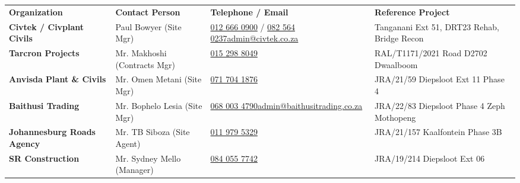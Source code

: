 \documentclass[a4paper,11pt]{article}
\begin{document}
\renewcommand{\arraystretch}{1.28}
\begin{tabularx}{\textwidth}{@{}
    >{\raggedright\arraybackslash}p{3.5cm} 
    >{\raggedright\arraybackslash}p{3.1cm} 
    >{\raggedright\arraybackslash}p{4.2cm} 
    >{\raggedright\arraybackslash}X
@{}}
\rowcolor{mhnavy}
{\color{white}\bfseries\fontsize{8pt}{9.8pt}\selectfont Organization} &
{\color{white}\bfseries\fontsize{8pt}{9.8pt}\selectfont Contact Person} &
{\color{white}\bfseries\fontsize{8pt}{9.8pt}\selectfont Telephone / Email} &
{\color{white}\bfseries\fontsize{8pt}{9.8pt}\selectfont Reference Project} \\
\rowcolor{mhbluelight}
\fontsize{7.6pt}{9.4pt}\selectfont\bfseries Civtek / Civplant Civils & \fontsize{7.6pt}{9.4pt}\selectfont Paul Bowyer (Site Mgr) & \fontsize{7.6pt}{9.4pt}\selectfont \href{tel:0126660900}{012 666 0900} / \href{tel:0825640237}{082 564 0237}\newline\href{mailto:admin@civtek.co.za}{admin@civtek.co.za} & \fontsize{7.6pt}{9.4pt}\selectfont Tanganani Ext 51, DRT23 Rehab, Bridge Recon \\
\fontsize{7.6pt}{9.4pt}\selectfont\bfseries Tarcron Projects & \fontsize{7.6pt}{9.4pt}\selectfont Mr. Makhoshi (Contracts Mgr) & \fontsize{7.6pt}{9.4pt}\selectfont \href{tel:0152988049}{015 298 8049} & \fontsize{7.6pt}{9.4pt}\selectfont RAL/T1171/2021 Road D2702 Dwaalboom \\
\rowcolor{mhbluelight}
\fontsize{7.6pt}{9.4pt}\selectfont\bfseries Anvisda Plant \& Civils & \fontsize{7.6pt}{9.4pt}\selectfont Mr. Omen Metani (Site Mgr) & \fontsize{7.6pt}{9.4pt}\selectfont \href{tel:0717041876}{071 704 1876} & \fontsize{7.6pt}{9.4pt}\selectfont JRA/21/59 Diepsloot Ext 11 Phase 4 \\
\fontsize{7.6pt}{9.4pt}\selectfont\bfseries Baithusi Trading & \fontsize{7.6pt}{9.4pt}\selectfont Mr. Bophelo Lesia (Site Mgr) & \fontsize{7.6pt}{9.4pt}\selectfont \href{tel:0680034790}{068 003 4790}\newline\href{mailto:admin@baithusitrading.co.za}{admin@baithusitrading.co.za} & \fontsize{7.6pt}{9.4pt}\selectfont JRA/22/83 Diepsloot Phase 4 Zeph Mothopeng \\
\rowcolor{mhbluelight}
\fontsize{7.6pt}{9.4pt}\selectfont\bfseries Johannesburg Roads Agency & \fontsize{7.6pt}{9.4pt}\selectfont Mr. TB Siboza (Site Agent) & \fontsize{7.6pt}{9.4pt}\selectfont \href{tel:0119795329}{011 979 5329} & \fontsize{7.6pt}{9.4pt}\selectfont JRA/21/157 Kaalfontein Phase 3B \\
\fontsize{7.6pt}{9.4pt}\selectfont\bfseries SR Construction & \fontsize{7.6pt}{9.4pt}\selectfont Mr. Sydney Mello (Manager) & \fontsize{7.6pt}{9.4pt}\selectfont \href{tel:0840557742}{084 055 7742} & \fontsize{7.6pt}{9.4pt}\selectfont JRA/19/214 Diepsloot Ext 06 \\

\end{tabularx}
\end{document}
